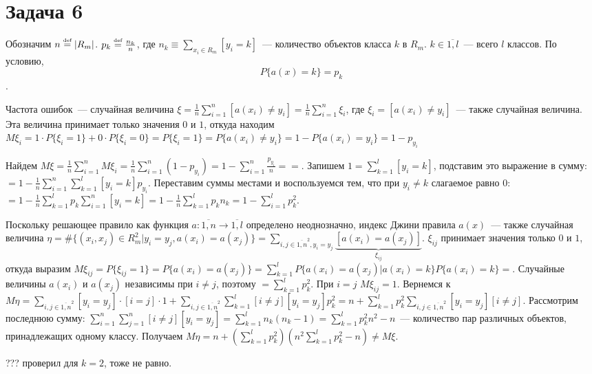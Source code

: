 \documentclass[a4paper]{article}
\def\eqdef{\overset{\mbox{\tiny def}}{=}}
\begin{document}
\section*{Задача 6}
Обозначим $n\eqdef |R_m|$. $p_k\eqdef\frac{n_k}{n}$, где $n_k\equiv\sum_{x_i\in R_m}[y_i=k]$~--- количество объектов класса $k$ в $R_m$. $k\in\overline{1,l}$~--- всего $l$ классов. По условию, $$P\{a(x)=k\}=p_k$$.

Частота ошибок~--- случайная величина $\xi=\frac{1}{n}\sum\limits_{i=1}^n[a(x_i)\neq y_i]=\frac{1}{n}\sum\limits_{i=1}^n\xi_i$, где $\xi_i=[a(x_i)\neq y_i]$~--- также случайная величина. Эта величина принимает только значения $0$ и $1$, откуда находим $M\xi_i=1\cdot P\{\xi_i=1\}+0\cdot P\{\xi_i=0\}=P\{\xi_i=1\}=P\{a(x_i)\neq y_i\}=1-P\{a(x_i)=y_i\}=1-p_{y_i}$

Найдем $M\xi=\frac{1}{n}\sum\limits_{i=1}^nM\xi_i=\frac{1}{n}\sum\limits_{i=1}^n(1-p_{y_i})=1-\sum\limits_{i=1}^n \frac{p_{y_i}}{n}=\boxed{=}$. Запишем $1=\sum\limits_{k=1}^l[y_i=k]$, подставим это выражение в сумму: $\boxed{=}1-\frac{1}{n}\sum\limits_{i=1}^n\sum\limits_{k=1}^l[y_i=k]p_{y_i}$. Переставим суммы местами и воспользуемся тем, что при $y_i\neq k$ слагаемое равно $0$: $\boxed{=}1-\frac{1}{n}\sum\limits_{k=1}^lp_{k}\sum\limits_{i=1}^n[y_i=k]=1-\frac{1}{n}\sum\limits_{k=1}^lp_kn_k=\boxed{1-\sum\limits_{i=1}^lp_k^2}$.

Поскольку решающее правило как функция $a\colon \overline{1,n}\to \overline{1,l}$ определено неоднозначно, индекс Джини правила $a(x)$~--- также случайная величина $\eta=\#\{(x_i,x_j)\in R_m^2| y_i=y_j, a(x_i)=a(x_j) \}=\sum\limits_{i,j\in\overline{1,n}^2, y_i= y_j}\underbrace{[a(x_i)=a(x_j)]}_{\xi_{ij}}$. $\xi_{ij}$ принимает значения только $0$ и $1$, откуда выразим $M\xi_{ij}=P\{\xi_{ij}=1\}=P\{a(x_i)=a(x_j)\}=\sum\limits_{k=1}^lP\{a(x_i)=a(x_j)| a(x_i)=k\}P\{a(x_i)=k\}\boxed{=}$. Случайные величины $a(x_i)$ и $a(x_j)$ независимы при $i\neq j$, поэтому $\boxed{=}\sum\limits_{k=1}^lp_k^2$. При $i=j$ $M\xi_{ij}=1$. Вернемся к $M\eta=\sum\limits_{i,j\in\overline{1,n}^2}[y_i= y_j]\cdot [i=j]\cdot 1+\sum\limits_{i,j\in\overline{1,n}^2}\sum\limits_{k=1}^l[i\neq j][y_i=y_j]p_k^2=n+\sum\limits_{k=1}^lp_k^2\sum\limits_{i,j\in\overline{1,n}^2}[y_i=y_j][i\neq j]$. Рассмотрим последнюю сумму: $\sum\limits_{i=1}^n\sum\limits_{j=1}^n[i\neq j][y_i=y_j]=\sum\limits_{k=1}^ln_k(n_k-1)=\sum\limits_{k=1}^lp_k^2n^2-n$~--- количество пар различных объектов, принадлежащих одному классу. Получаем $M\eta=n+(\sum\limits_{k=1}^lp_k^2)(n^2\sum\limits_{k=1}^lp_k^2-n)\neq M\xi$.

??? проверил для $k=2$, тоже не равно.
\end{document}

